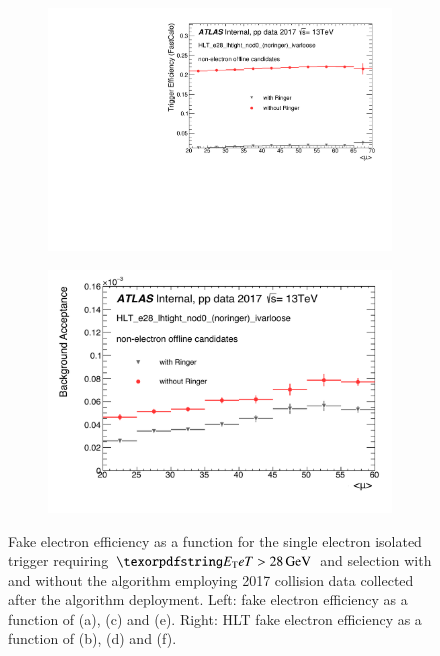 \begin{figure}[h!tb]
\begin{subfigure}[c]{.49\textwidth}
  \centering
  \includegraphics[width=\textwidth]{sections/03_operation/figures/efficiencies/eff_EGAM7_e28_ringer_and_noringer_2017_after_ts1_L2Calo_mu.pdf}
  \caption{}
  \end{subfigure}
  \begin{subfigure}[c]{.49\textwidth}
  \centering
  \includegraphics[width=\textwidth]{sections/03_operation/figures/efficiencies/eff_EGAM7_e28_ringer_and_noringer_2017_after_ts1_mu.pdf}
  \caption{}
  \end{subfigure}

  \caption{ Fake electron efficiency as a function for the single electron isolated trigger requiring $\et > \SI{28}{\GeV}$ and \tight selection with and without the \rnn{} algorithm employing 2017 collision data collected after the \rnn algorithm deployment. Left: \fastcalo fake electron efficiency as a function of \et (a), \eta (c) and \avgmu (e). Right: HLT fake electron efficiency as a function of \et (b), \eta (d) and \avgmu (f).}%
  \label{fig:2017_fake_triggers}
\end{figure}




